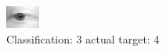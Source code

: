 \begin{figure}[h!]
\begin{center}
\includegraphics[width=0.60\columnwidth]{figures/ID2597_class_3_target_4.png}
\end{center}
\caption{ Classification: 3 actual target: 4}
\label{fig:ID2597_class_3_target_4}
\end{figure}
